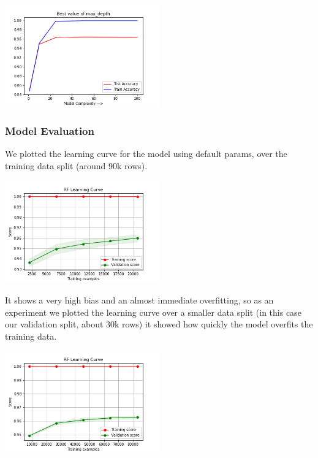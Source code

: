\begin{center}
    \captionsetup{type=figure}
    \includegraphics[width=250px]{RF_complexity_depth.png}
\end{center}
\subsubsection{Model Evaluation}
We plotted the learning curve for the model using default params, over the training data split (around 90k rows).
\begin{center}
    \captionsetup{type=figure}
    \includegraphics[width=250px]{learning_curve_RF_small.png}
\end{center}
It shows a very high bias and an almost immediate overfitting, so as an experiment we plotted the learning curve over a smaller data split (in this case our validation split, about 30k rows) it showed how quickly the model overfits the training data.
\begin{center}
    \captionsetup{type=figure}
    \includegraphics[width=250px]{learning_curve_RF_big.png}
\end{center}